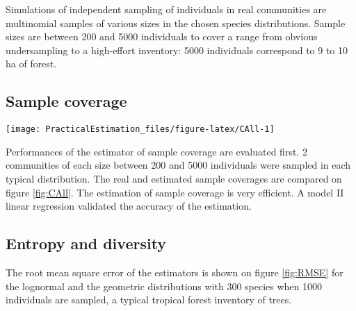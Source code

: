 \documentclass[fleqn,10pt]{latex/stylish_article} %
\begin{document}
Simulations of independent sampling of individuals in real communities are multinomial samples of various sizes in the chosen species distributions.
Sample sizes are between 200 and 5000 individuals to cover a range from obvious undersampling to a high-effort inventory: 5000 individuals correspond to 9 to 10 ha of forest.

\hypertarget{sample-coverage-1}{%
\subsection{Sample coverage}\label{sample-coverage-1}}



\scriptsize

\begin{figure*}

{\centering \texttt{[image: PracticalEstimation\_files/figure-latex/CAll-1]} 

}

\caption{Estimated vs real sample coverage of simulated samples of a lognormal (a) or geometric (b) distribution of 300 species. Sample sizes are between 200 and 5000 individuals. The line represents the fit of a model II (Major Axis method) linear regression. a) Lognormal distribution: The estimated sample coverage is 0.991 times the real one plus 0.009, with an \(R^2\) value around 94\%. b) Geometric distribution: The estimated sample coverage is 1.046 times the real one minus 0.046, with an \(R^2\) value around 69\%.}\label{fig:CAll}
\end{figure*}

\normalsize

Performances of the estimator of sample coverage are evaluated first.
2 communities of each size between 200 and 5000 individuals were sampled in each typical distribution.
The real and estimated sample coverages are compared on figure \ref{fig:CAll}.
The estimation of sample coverage is very efficient.
A model II linear regression \citep{Legendre2014} validated the accuracy of the estimation.

\hypertarget{entropy-and-diversity}{%
\subsection{Entropy and diversity}\label{entropy-and-diversity}}

\scriptsize

\normalsize

The root mean square error of the estimators is shown on figure \ref{fig:RMSE} for the lognormal and the geometric distributions with 300 species when 1000 individuals are sampled, a typical tropical forest inventory of trees.
\end{document}

